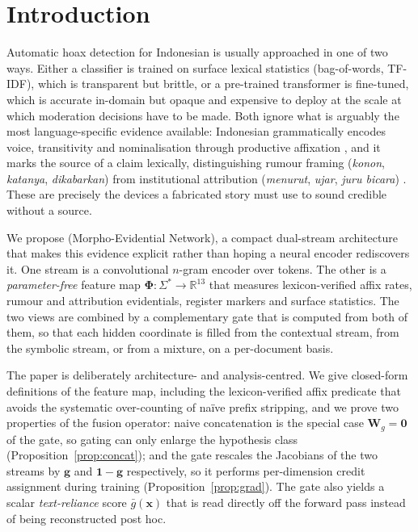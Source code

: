 \section{Introduction}
\label{sec:intro}

Automatic hoax detection for Indonesian is usually approached in one of two ways. Either a classifier is
trained on surface lexical statistics (bag-of-words, TF-IDF), which is transparent but brittle, or a
pre-trained transformer is fine-tuned, which is accurate in-domain but opaque and expensive to deploy at
the scale at which moderation decisions have to be made. Both ignore what is arguably the most
language-specific evidence available: Indonesian grammatically encodes voice, transitivity and
nominalisation through productive affixation \citep{sneddon2010indonesian}, and it marks the source of a
claim lexically, distinguishing rumour framing (\emph{konon}, \emph{katanya}, \emph{dikabarkan}) from
institutional attribution (\emph{menurut}, \emph{ujar}, \emph{juru bicara})
\citep{aikhenvald2004evidentiality}. These are precisely the devices a fabricated story must use to
sound credible without a source.

We propose \menet{} (Morpho-Evidential Network), a compact dual-stream architecture that makes this
evidence explicit rather than hoping a neural encoder rediscovers it. One stream is a convolutional
$n$-gram encoder over tokens. The other is a \emph{parameter-free} feature map
$\bm{\Phi}:\Sigma^{*}\to\mathbb{R}^{13}$ that measures lexicon-verified affix rates, rumour and
attribution evidentials, register markers and surface statistics. The two views are combined by a
complementary gate that is computed from both of them, so that each hidden coordinate is filled from the
contextual stream, from the symbolic stream, or from a mixture, on a per-document basis.

The paper is deliberately architecture- and analysis-centred. We give closed-form definitions of the
feature map, including the lexicon-verified affix predicate that avoids the systematic over-counting of
naïve prefix stripping, and we prove two properties of the fusion operator: naive concatenation is the
special case $\mathbf{W}_g=\mathbf{0}$ of the gate, so gating can only enlarge the hypothesis class
(Proposition~\ref{prop:concat}); and the gate rescales the Jacobians of the two streams by $\mathbf{g}$ and
$\mathbf{1}-\mathbf{g}$ respectively, so it performs per-dimension credit assignment during training
(Proposition~\ref{prop:grad}). The gate also yields a scalar \emph{text-reliance} score $\bar g(\mathbf{x})$
that is read directly off the forward pass instead of being reconstructed post hoc.

